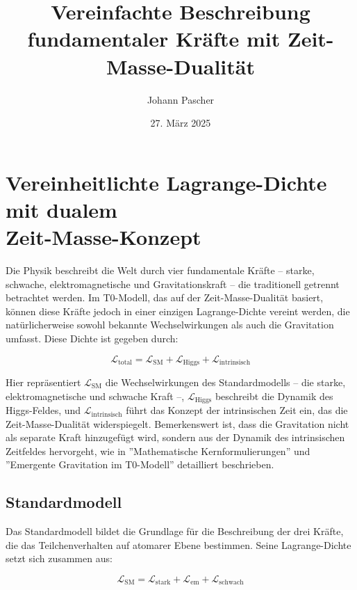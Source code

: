 \documentclass[a4paper,12pt]{article}
\title{Vereinfachte Beschreibung fundamentaler Kräfte mit Zeit-Masse-Dualität}
\author{Johann Pascher}
\date{27. März 2025}
\begin{document}
	
	\maketitle
	
	\tableofcontents
	\newpage
	
	\section{Vereinheitlichte Lagrange-Dichte mit dualem \\Zeit-Masse-Konzept}
	
	Die Physik beschreibt die Welt durch vier fundamentale Kräfte – starke, schwache, elektromagnetische und Gravitationskraft – die traditionell getrennt betrachtet werden. Im T0-Modell, das auf der Zeit-Masse-Dualität basiert, können diese Kräfte jedoch in einer einzigen Lagrange-Dichte vereint werden, die natürlicherweise sowohl bekannte Wechselwirkungen als auch die Gravitation umfasst. Diese Dichte ist gegeben durch:
	
	\begin{equation}
		\mathcal{L}_\text{total} = \mathcal{L}_\text{SM} + \mathcal{L}_\text{Higgs} + \mathcal{L}_\text{intrinsisch}
	\end{equation}
	
	Hier repräsentiert \(\mathcal{L}_\text{SM}\) die Wechselwirkungen des Standardmodells – die starke, elektromagnetische und schwache Kraft –, \(\mathcal{L}_\text{Higgs}\) beschreibt die Dynamik des Higgs-Feldes, und \(\mathcal{L}_\text{intrinsisch}\) führt das Konzept der intrinsischen Zeit ein, das die Zeit-Masse-Dualität widerspiegelt. Bemerkenswert ist, dass die Gravitation nicht als separate Kraft hinzugefügt wird, sondern aus der Dynamik des intrinsischen Zeitfeldes hervorgeht, wie in ''Mathematische Kernformulierungen'' \cite{pascher_lagrange_2025} und ''Emergente Gravitation im T0-Modell'' \cite{pascher_emergente_gravitation_2025} detailliert beschrieben.
	
	\subsection{Standardmodell}
	
	Das Standardmodell bildet die Grundlage für die Beschreibung der drei Kräfte, die das Teilchenverhalten auf atomarer Ebene bestimmen. Seine Lagrange-Dichte setzt sich zusammen aus:
	
	\begin{equation}
		\mathcal{L}_\text{SM} = \mathcal{L}_\text{stark} + \mathcal{L}_\text{em} + \mathcal{L}_\text{schwach}
	\end{equation}
	
\end{document}
